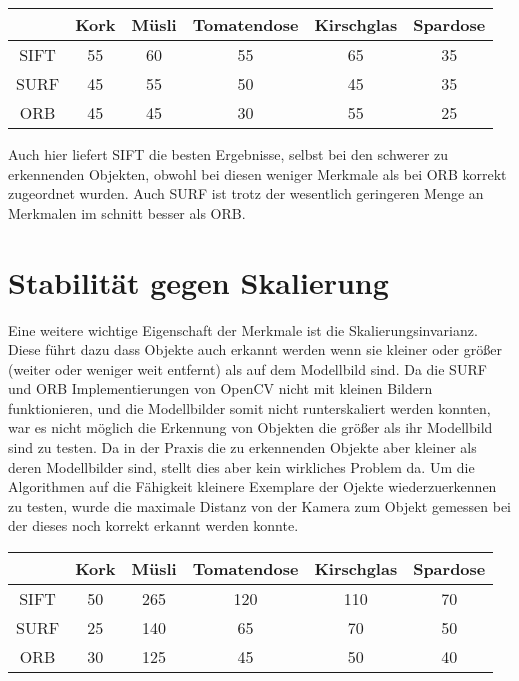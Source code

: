 \begin{center}
    \begin{tabular}{ c | C | C | C | C | C |}
      & Kork & Müsli & Tomatendose & Kirschglas & Spardose \\ \hline
    SIFT & 55 & 60 & 55 & 65 & 35 \\ \hline
    SURF & 45 & 55 & 50 & 45 & 35 \\ \hline
    ORB & 45 & 45 & 30 & 55 & 25 \\
    \hline
    \end{tabular}
\end{center}

Auch hier liefert SIFT die besten Ergebnisse, selbst bei den schwerer zu erkennenden Objekten, obwohl bei diesen weniger Merkmale als bei ORB korrekt zugeordnet wurden.
Auch SURF ist trotz der wesentlich geringeren Menge an Merkmalen im schnitt besser als ORB.

\section{Stabilität gegen Skalierung}

Eine weitere wichtige Eigenschaft der Merkmale ist die Skalierungsinvarianz.
Diese führt dazu dass Objekte auch erkannt werden wenn sie kleiner oder größer (weiter oder weniger weit entfernt) als auf dem Modellbild sind.
Da die SURF und ORB Implementierungen von OpenCV nicht mit kleinen Bildern funktionieren, und die Modellbilder somit nicht runterskaliert werden konnten, war es nicht möglich die Erkennung von Objekten die größer als ihr Modellbild sind zu testen.
Da in der Praxis die zu erkennenden Objekte aber kleiner als deren Modellbilder sind, stellt dies aber kein wirkliches Problem da.
Um die Algorithmen auf die Fähigkeit kleinere Exemplare der Ojekte wiederzuerkennen zu testen, wurde die maximale Distanz von der Kamera zum Objekt gemessen bei der dieses noch korrekt erkannt werden konnte.

\begin{center}
    \begin{tabular}{ c | C | C | C | C | C |}
      & Kork & Müsli & Tomatendose & Kirschglas & Spardose \\ \hline
    SIFT & 50 & 265 & 120 & 110 & 70 \\ \hline
    SURF & 25 & 140 & 65 & 70 & 50 \\ \hline
    ORB & 30 & 125 & 45 & 50 & 40 \\
    \hline
    \end{tabular}
\end{center}

